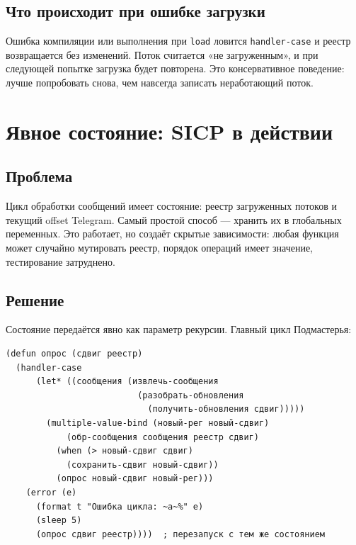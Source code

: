 \documentclass[11pt,a4paper]{article}
\begin{document}
\subsection{Что происходит при ошибке загрузки}

Ошибка компиляции или выполнения при \texttt{load} ловится \texttt{handler-case} и реестр возвращается без изменений. Поток считается «не загруженным», и при следующей попытке загрузка будет повторена. Это консервативное поведение: лучше попробовать снова, чем навсегда записать неработающий поток.

\section{Явное состояние: SICP в действии}
\label{sec:state}

\subsection{Проблема}

Цикл обработки сообщений имеет состояние: реестр загруженных потоков и текущий offset Telegram. Самый простой способ — хранить их в глобальных переменных. Это работает, но создаёт скрытые зависимости: любая функция может случайно мутировать реестр, порядок операций имеет значение, тестирование затруднено.

\subsection{Решение}

Состояние передаётся явно как параметр рекурсии. Главный цикл Подмастерья:

\begin{lstlisting}[caption={подмастерье/main.lisp — рекурсия с явным состоянием}]
(defun опрос (сдвиг реестр)
  (handler-case
      (let* ((сообщения (извлечь-сообщения
                          (разобрать-обновления
                            (получить-обновления сдвиг)))))
        (multiple-value-bind (новый-рег новый-сдвиг)
            (обр-сообщения сообщения реестр сдвиг)
          (when (> новый-сдвиг сдвиг)
            (сохранить-сдвиг новый-сдвиг))
          (опрос новый-сдвиг новый-рег)))
    (error (e)
      (format t "Ошибка цикла: ~a~%" e)
      (sleep 5)
      (опрос сдвиг реестр))))  ; перезапуск с тем же состоянием
\end{lstlisting}
\end{document}
